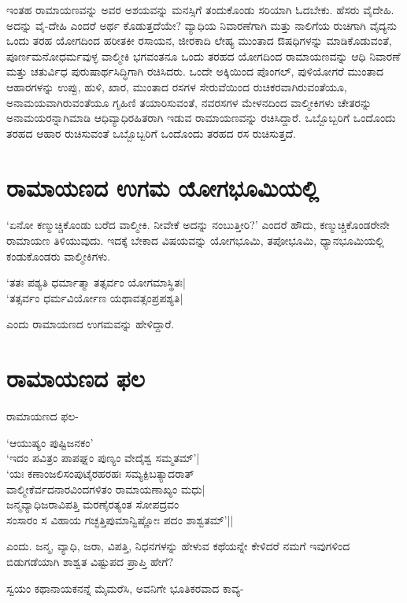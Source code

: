 ಇಂತಹ ರಾಮಾಯಣವನ್ನು ಅವರ 
ಅಶಯವನ್ನು ಮನಸ್ಸಿಗೆ 
ತಂದುಕೊಂಡು ಸರಿಯಾಗಿ ಓದಬೇಕು. 
ಹೆಸರು ವೈದೇಹಿ. ಅದನ್ನು 
ವೈ-ದೇಹಿ ಎಂದರೆ ಅರ್ಥ 
ಕೊಡುತ್ತದೆಯೇ? ವ್ಯಾಧಿಯ 
ನಿವಾರಣೆಗಾಗಿ ಮತ್ತು ನಾಲಿಗೆಯ 
ರುಚಿಗಾಗಿ ವೈದ್ಯನು ಒಂದು ತರಹ 
ಯೋಗದಿಂದ ಹರೀತಕೀ ರಸಾಯನ, 
ಜೀರಕಾದಿ ಲೇಹ್ಯ ಮುಂತಾದ 
ಔಷಧಿಗಳನ್ನು ಮಾಡಿಕೊಡುವಂತೆ, 
ಪೂರ್ಣಮನೋಧರ್ಮವುಳ್ಳ 
ವಾಲ್ಮೀಕಿ ಭಗವಂತನೂ ಒಂದು 
ತರಹದ ಯೋಗದಿಂದ ರಾಮಾಯಣವನ್ನು 
ಆಧಿ ನಿವಾರಣೆ ಮತ್ತು 
ಚತುರ್ವಿಧ 
ಪುರುಷಾರ್ಥಸಿದ್ಧಿಗಾಗಿ 
ರಚಿಸಿದರು. ಒಂದೇ ಅಕ್ಕಿಯಿಂದ 
ಪೊಂಗಲ್, ಪುಳಿಯೋಗರೆ ಮುಂತಾದ 
ಆಹಾರಗಳನ್ನು ಉಪ್ಪು, ಹುಳಿ, 
ಖಾರ, ಮುಂತಾದ ರಸಗಳ 
ಸೇರುವೆಯಿಂದ 
ರುಚಿಕರವಾಗಿರುವಂತೆಯೂ, 
ಅನಾಮಯವಾಗಿರುವಂತೆಯೂ ಗೃಹಿಣಿ 
ತಯಾರಿಸುವಂತೆ, ನವರಸಗಳ 
ಮೇಳನದಿಂದ ವಾಲ್ಮೀಕಿಗಳು 
ಚೇತರನ್ನು 
ಅನಾಮಯರನ್ನಾಗಿಮಾಡಿ 
ಆಧಿವ್ಯಾಧಿರಹಿತರಾಗಿ ಇಡುವ 
ರಾಮಾಯಣವನ್ನು ರಚಿಸಿದ್ದಾರೆ. 
ಒಬ್ಬೊಬ್ಬರಿಗೆ ಒಂದೊಂದು ತರಹದ 
ಆಹಾರ ರುಚಿಸುವಂತೆ ಒಬ್ಬೊಬ್ಬರಿಗೆ ಒಂದೊಂದು ತರಹದ ರಸ ರುಚಿಸುತ್ತದೆ.

\section*{ರಾಮಾಯಣದ ಉಗಮ ಯೋಗಭೂಮಿಯಲ್ಲಿ}

`ಏನೋ ಕಣ್ಮುಚ್ಚಿಕೊಂಡು ಬರೆದ 
ವಾಲ್ಮೀಕಿ. ನೀವೇಕೆ ಅದನ್ನು 
ನಂಬುತ್ತೀರಿ?' ಎಂದರೆ ಹೌದು,  
ಕಣ್ಮುಚ್ಚಿಕೊಂಡರೇನೇ ರಾಮಾಯಣ 
ತಿಳಿಯುವುದು. ಇದಕ್ಕೆ  ಬೇಕಾದ 
ವಿಷಯವನ್ನು ಯೋಗಭೂಮಿ, ತಪೋಭೂಮಿ, ಧ್ಯಾನಭೂಮಿಯಲ್ಲಿ ಕಂಡುಕೊಂಡರು ವಾಲ್ಮೀಕಿಗಳು. 

\begin{shloka}
`ತತಃ ಪಶ್ಯತಿ ಧರ್ಮಾತ್ಮಾ ತತ್ಸರ್ವಂ ಯೋಗಮಾಸ್ಥಿತಃ|\\
`ತತ್ಸರ್ವಂ ಧರ್ಮವಿರ್ಯೋಣ ಯಥಾವತ್ಸಂಪ್ರಪಶ್ಯತಿ|
\end{shloka}
ಎಂದು ರಾಮಾಯಣದ ಉಗಮವನ್ನು ಹೇಳಿದ್ದಾರೆ.

\section*{ರಾಮಾಯಣದ ಫಲ}

ರಾಮಾಯಣದ ಫಲ-

\begin{shloka}
`ಆಯುಷ್ಯಂ ಪುಷ್ಟಿಜನಕಂ'\\
`ಇದಂ ಪವಿತ್ರಂ ಪಾಪಘ್ನಂ ಪುಣ್ಯಂ ವೇದೈಶ್ವ ಸಮ್ಮತಮ್'|\\
`ಯಃ ಕಣಾಂಜಲಿಸಂಪುಟೈರಹರಹಃ ಸಮ್ಯಕ್ಪಿಬತ್ಯಾದರಾತ್\\
ವಾಲ್ಮೀಕೆರ್ವದನಾರವಿಂದಗಳಿತಂ ರಾಮಾಯಣಾಖ್ಯಂ ಮಧು|\\
ಜನ್ಮವ್ಯಾಧಿಜರಾವಿಪತ್ತಿ ಮರಣೈರತ್ಯಂತ ಸೋಪದ್ರವಂ\\
ಸಂಸಾರಂ ಸ ವಿಹಾಯ ಗಚ್ಛತ್ತಿಪುಮಾನ್ವಿಷ್ಣೋಃ ಪದಂ ಶಾಶ್ವತಮ್'||
\end{shloka}
ಎಂದು. ಜನ್ಮ, ವ್ಯಾಧಿ, ಜರಾ, 
ವಿಪತ್ತಿ, ನಿಧನಗಳನ್ನು ಹೇಳುವ 
ಕಥೆಯನ್ನೇ ಕೇಳಿದರೆ ನಮಗೆ 
ಇವುಗಳಿಂದ ಬಿಡುಗಡೆಯಾಗಿ ಶಾಶ್ವತ ವಿಷ್ಟುಪದ ಪ್ರಾಪ್ತಿ ಹೇಗೆ?

ಸ್ವಯಂ ಕಥಾನಾಯಕನನ್ನೆ ಮೈಮರೆಸಿ, ಅವನಿಗೇ ಭೂತಿಕರವಾದ ಕಾವ್ಯ-


